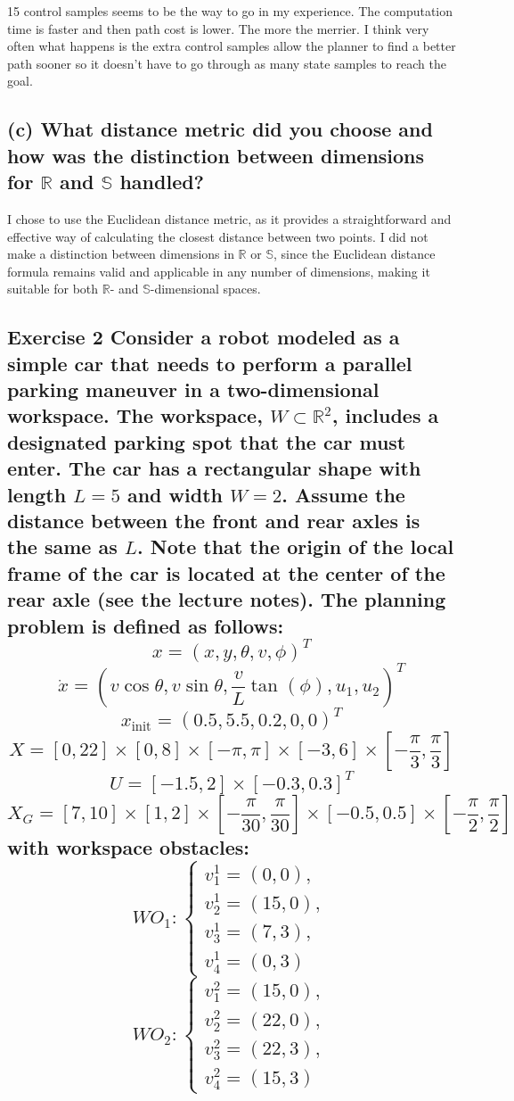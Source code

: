 \documentclass{article}
\begin{document}
15 control samples seems to be the way to go in my experience. The computation time is faster and then path cost is lower. The more the merrier.
I think very often what happens is the extra control samples allow the planner to find a better path sooner so it doesn't have to go through as many state samples to reach the goal.

\subsection*{(c) What distance metric did you choose and how was the distinction between dimensions for \(\mathbb{R}\) and \(\mathbb{S}\) handled?}

I chose to use the Euclidean distance metric, as it provides a straightforward and effective way of calculating the closest distance between two points. I did not make a distinction between dimensions in \(\mathbb{R}\) or \(\mathbb{S}\), since the Euclidean distance formula remains valid and applicable in any number of dimensions, making it suitable for both \(\mathbb{R}\)- and \(\mathbb{S}\)-dimensional spaces.

\subsection*{Exercise 2
Consider a robot modeled as a simple car that needs to perform a parallel parking maneuver in a two-dimensional workspace. The workspace, \( W \subset \mathbb{R}^2 \), includes a designated parking spot that the car must enter. The car has a rectangular shape with length \( L = 5 \) and width \( W = 2 \). Assume the distance between the front and rear axles is the same as \( L \). Note that the origin of the local frame of the car is located at the center of the rear axle (see the lecture notes).
The planning problem is defined as follows:
\[
x = (x, y, \theta, v, \phi)^T
\]
\[
\dot{x} = (v \cos \theta, v \sin \theta, \frac{v}{L} \tan(\phi), u_1, u_2)^T
\]
\[
x_{\text{init}} = (0.5, 5.5, 0.2, 0, 0)^T
\]
\[
X = [0, 22] \times [0, 8] \times [-\pi, \pi] \times [-3, 6] \times \left[-\frac{\pi}{3}, \frac{\pi}{3}\right]
\]
\[
U = [-1.5, 2] \times [-0.3, 0.3]^T
\]
\[
X_G = [7, 10] \times [1, 2] \times \left[-\frac{\pi}{30}, \frac{\pi}{30}\right] \times [-0.5, 0.5] \times \left[-\frac{\pi}{2}, \frac{\pi}{2}\right]
\]
with workspace obstacles:
\[
WO_1 : \begin{cases} v_1^1 = (0, 0), \\ v_2^1 = (15, 0), \\ v_3^1 = (7, 3), \\ v_4^1 = (0, 3) \end{cases}
\]
\[
WO_2 : \begin{cases} v_1^2 = (15, 0), \\ v_2^2 = (22, 0), \\ v_3^2 = (22, 3), \\ v_4^2 = (15, 3) \end{cases}
\]
}
\end{document}
